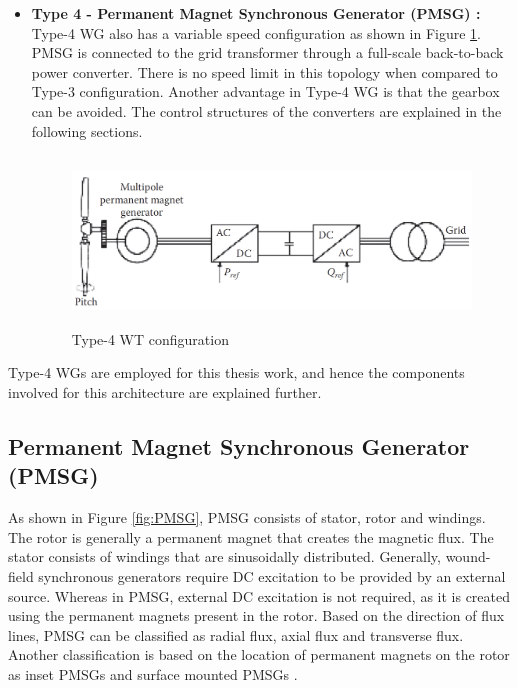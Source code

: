 \begin{itemize}
    \item \textbf{Type 4 - Permanent Magnet Synchronous Generator (PMSG) :} Type-4 \gls{WG} also has a variable speed configuration as shown in Figure \ref{fig:Type4}. \gls{PMSG} is connected to the grid transformer through a full-scale back-to-back power converter. There is no speed limit in this topology when compared to Type-3 configuration. Another advantage in Type-4 \gls{WG} is that the gearbox can be avoided. The control structures of the converters are explained in the following sections.
    
\begin{figure}[H]
\centering
    \includegraphics[height = 4.5cm,width = 11.5cm]{Diagrams/Chapter_2/Type4WT_1.png}
    \caption{Type-4 WT configuration \cite{ali_wind_2012}}
    \label{fig:Type4}
\end{figure}
\end{itemize}

Type-4 \gls{WG}s are employed for this thesis work, and hence the components involved for this architecture are explained further.

\subsection{Permanent Magnet Synchronous Generator (PMSG)}\label{PMSG}
As shown in Figure \ref{fig:PMSG}, \gls{PMSG} consists of stator, rotor and windings. The rotor is generally a permanent magnet that creates the magnetic flux. The stator consists of windings that are sinusoidally distributed. Generally, wound-field synchronous generators require \gls{DC} excitation to be provided by an external source. Whereas in \gls{PMSG}, external \gls{DC} excitation is not required, as it is created using the permanent magnets present in the rotor. Based on the direction of flux lines, \gls{PMSG} can be classified as radial flux, axial flux and transverse flux. Another classification is based on the location of permanent magnets on the rotor as inset \gls{PMSG}s and surface mounted \gls{PMSG}s \cite{sebastian_transient_1989}.  

